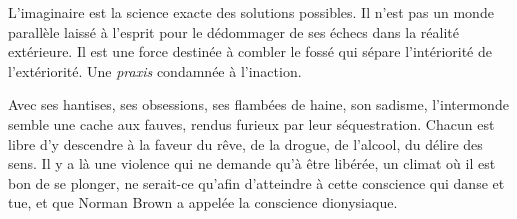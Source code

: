 \documentclass[french,twoside]{book} %
\newcommand{\astermono}{\medskip\centerline{\color{rubric}\large\selectfont{\syms ✻}}\medskip\par}%
\begin{document}
\astermono

\noindent L’imaginaire est la science exacte des solutions possibles. Il n’est pas un monde parallèle laissé à l’esprit pour le dédommager de ses échecs dans la réalité extérieure. Il est une force destinée à combler le fossé qui sépare l’intériorité de l’extériorité. Une \emph{praxis} condamnée à l’inaction.\par
Avec ses hantises, ses obsessions, ses flambées de haine, son sadisme, l’intermonde semble une cache aux fauves, rendus furieux par leur séquestration. Chacun est libre d’y descendre à la faveur du rêve, de la drogue, de l’alcool, du délire des sens. Il y a là une violence qui ne demande qu’à être libérée, un climat où il est bon de se plonger, ne serait-ce qu’afin d’atteindre à cette conscience qui danse et tue, et que Norman Brown a appelée la conscience dionysiaque.
\end{document}
